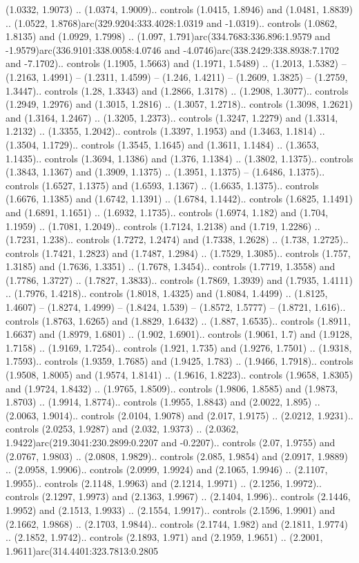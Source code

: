 (1.0332, 1.9073) .. (1.0374, 1.9009).. controls (1.0415, 1.8946) and (1.0481, 1.8839) .. (1.0522, 1.8768)arc(329.9204:333.4028:1.0319 and -1.0319).. controls (1.0862, 1.8135) and (1.0929, 1.7998) .. (1.097, 1.791)arc(334.7683:336.896:1.9579 and -1.9579)arc(336.9101:338.0058:4.0746 and -4.0746)arc(338.2429:338.8938:7.1702 and -7.1702).. controls (1.1905, 1.5663) and (1.1971, 1.5489) .. (1.2013, 1.5382) -- (1.2163, 1.4991) -- (1.2311, 1.4599) -- (1.246, 1.4211) -- (1.2609, 1.3825) -- (1.2759, 1.3447).. controls (1.28, 1.3343) and (1.2866, 1.3178) .. (1.2908, 1.3077).. controls (1.2949, 1.2976) and (1.3015, 1.2816) .. (1.3057, 1.2718).. controls (1.3098, 1.2621) and (1.3164, 1.2467) .. (1.3205, 1.2373).. controls (1.3247, 1.2279) and (1.3314, 1.2132) .. (1.3355, 1.2042).. controls (1.3397, 1.1953) and (1.3463, 1.1814) .. (1.3504, 1.1729).. controls (1.3545, 1.1645) and (1.3611, 1.1484) .. (1.3653, 1.1435).. controls (1.3694, 1.1386) and (1.376, 1.1384) .. (1.3802, 1.1375).. controls (1.3843, 1.1367) and (1.3909, 1.1375) .. (1.3951, 1.1375) -- (1.6486, 1.1375).. controls (1.6527, 1.1375) and (1.6593, 1.1367) .. (1.6635, 1.1375).. controls (1.6676, 1.1385) and (1.6742, 1.1391) .. (1.6784, 1.1442).. controls (1.6825, 1.1491) and (1.6891, 1.1651) .. (1.6932, 1.1735).. controls (1.6974, 1.182) and (1.704, 1.1959) .. (1.7081, 1.2049).. controls (1.7124, 1.2138) and (1.719, 1.2286) .. (1.7231, 1.238).. controls (1.7272, 1.2474) and (1.7338, 1.2628) .. (1.738, 1.2725).. controls (1.7421, 1.2823) and (1.7487, 1.2984) .. (1.7529, 1.3085).. controls (1.757, 1.3185) and (1.7636, 1.3351) .. (1.7678, 1.3454).. controls (1.7719, 1.3558) and (1.7786, 1.3727) .. (1.7827, 1.3833).. controls (1.7869, 1.3939) and (1.7935, 1.4111) .. (1.7976, 1.4218).. controls (1.8018, 1.4325) and (1.8084, 1.4499) .. (1.8125, 1.4607) -- (1.8274, 1.4999) -- (1.8424, 1.539) -- (1.8572, 1.5777) -- (1.8721, 1.616).. controls (1.8763, 1.6265) and (1.8829, 1.6432) .. (1.887, 1.6535).. controls (1.8911, 1.6637) and (1.8979, 1.6801) .. (1.902, 1.6901).. controls (1.9061, 1.7) and (1.9128, 1.7158) .. (1.9169, 1.7254).. controls (1.921, 1.735) and (1.9276, 1.7501) .. (1.9318, 1.7593).. controls (1.9359, 1.7685) and (1.9425, 1.783) .. (1.9466, 1.7918).. controls (1.9508, 1.8005) and (1.9574, 1.8141) .. (1.9616, 1.8223).. controls (1.9658, 1.8305) and (1.9724, 1.8432) .. (1.9765, 1.8509).. controls (1.9806, 1.8585) and (1.9873, 1.8703) .. (1.9914, 1.8774).. controls (1.9955, 1.8843) and (2.0022, 1.895) .. (2.0063, 1.9014).. controls (2.0104, 1.9078) and (2.017, 1.9175) .. (2.0212, 1.9231).. controls (2.0253, 1.9287) and (2.032, 1.9373) .. (2.0362, 1.9422)arc(219.3041:230.2899:0.2207 and -0.2207).. controls (2.07, 1.9755) and (2.0767, 1.9803) .. (2.0808, 1.9829).. controls (2.085, 1.9854) and (2.0917, 1.9889) .. (2.0958, 1.9906).. controls (2.0999, 1.9924) and (2.1065, 1.9946) .. (2.1107, 1.9955).. controls (2.1148, 1.9963) and (2.1214, 1.9971) .. (2.1256, 1.9972).. controls (2.1297, 1.9973) and (2.1363, 1.9967) .. (2.1404, 1.996).. controls (2.1446, 1.9952) and (2.1513, 1.9933) .. (2.1554, 1.9917).. controls (2.1596, 1.9901) and (2.1662, 1.9868) .. (2.1703, 1.9844).. controls (2.1744, 1.982) and (2.1811, 1.9774) .. (2.1852, 1.9742).. controls (2.1893, 1.971) and (2.1959, 1.9651) .. (2.2001, 1.9611)arc(314.4401:323.7813:0.2805 